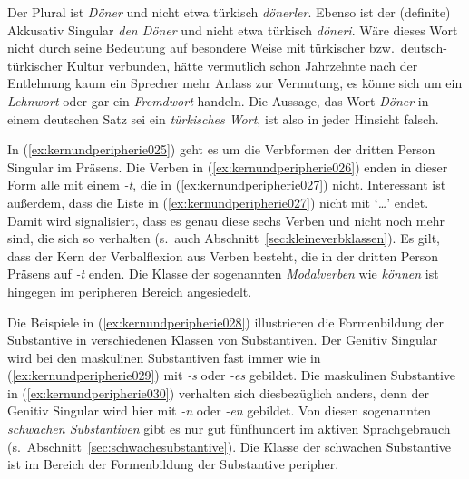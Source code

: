 Der Plural ist \textit{Döner} und nicht etwa türkisch \textit{dönerler}.
Ebenso ist der (definite) Akkusativ Singular \textit{den Döner} und nicht etwa türkisch \textit{döneri}.
Wäre dieses Wort nicht durch seine Bedeutung auf besondere Weise mit türkischer bzw.\ deutsch-türkischer Kultur verbunden, hätte vermutlich schon Jahrzehnte nach der Entlehnung kaum ein Sprecher mehr Anlass zur Vermutung, es könne sich um ein \textit{Lehnwort} oder gar ein \textit{Fremdwort} handeln.
Die Aussage, das Wort \textit{Döner} in einem deutschen Satz sei ein \textit{türkisches Wort}, ist also in jeder Hinsicht falsch.


In (\ref{ex:kernundperipherie025}) geht es um die Verbformen der dritten Person Singular im Präsens.
Die Verben in (\ref{ex:kernundperipherie026}) enden in dieser Form alle mit einem \textit{-t}, die in (\ref{ex:kernundperipherie027}) nicht.
Interessant ist außerdem, dass die Liste in (\ref{ex:kernundperipherie027}) nicht mit `\textit{\ldots}' endet.
Damit wird signalisiert, dass es genau diese sechs Verben und nicht noch mehr sind, die sich so verhalten (s.\ auch Abschnitt~\ref{sec:kleineverbklassen}).
Es gilt, dass der Kern der Verbalflexion aus Verben besteht, die in der dritten Person Präsens auf \textit{-t} enden.
Die Klasse der sogenannten \textit{Modalverben} wie \textit{können} ist hingegen im peripheren Bereich angesiedelt.


Die Beispiele in (\ref{ex:kernundperipherie028}) illustrieren die Formenbildung der Substantive in verschiedenen Klassen von Substantiven.
Der Genitiv Singular wird bei den maskulinen Substantiven fast immer wie in (\ref{ex:kernundperipherie029}) mit \textit{-s} oder \textit{-es} gebildet.
Die maskulinen Substantive in (\ref{ex:kernundperipherie030}) verhalten sich diesbezüglich anders, denn der Genitiv Singular wird hier mit \textit{-n} oder \textit{-en} gebildet.
Von diesen sogenannten \textit{schwachen Substantiven} gibt es nur gut fünfhundert im aktiven Sprachgebrauch (s.\ Abschnitt~\ref{sec:schwachesubstantive}).
Die Klasse der schwachen Substantive ist im Bereich der Formenbildung der Substantive peripher.



